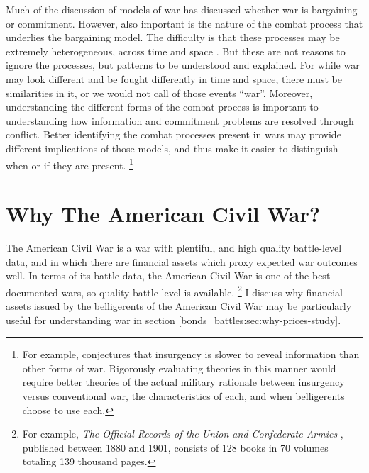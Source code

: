 Much of the discussion of models of war has discussed whether war is bargaining or commitment.
However, also important is the nature of the combat process that underlies the bargaining model. %
The difficulty is that these processes may be extremely heterogeneous, across time and space \parencite{Reiter2003}.
But these are not reasons to ignore the processes, but patterns to be understood and explained. %
For while war may look different and be fought differently in time and
space, there must be similarities in it, or we would not call of those events ``war''. %
Moreover, understanding the different forms of the combat process is important to understanding how information and commitment problems are resolved through conflict. %
Better identifying the combat processes present in wars may provide different implications of those models, and thus make it easier to
distinguish when or if they are present.%
\footnote{%
  For example, \textcite{Walter2009} conjectures that insurgency is slower to reveal information than other forms of war. %
  Rigorously evaluating theories in this manner would require better theories of the actual military rationale between insurgency versus conventional war, the characteristics of each, and when belligerents choose to use each.
} %



\section{Why The American Civil War?}
\label{bonds_battles:sec:why-american-civil}

The American Civil War is a war with plentiful, and high quality battle-level data, and in which there are financial assets which proxy expected war outcomes well.
In terms of its battle data, the American Civil War is one of the best documented wars, so quality battle-level is available.%
\footnote{%
  For example, \textit{The Official Records of the Union and  Confederate Armies} \parencites{US1901}, published between 1880 and 1901, consists of 128 books in 70 volumes totaling 139 thousand pages.
  
} %
I discuss why financial assets issued by the belligerents of the American Civil War may be particularly useful for understanding war in section \ref{bonds_battles:sec:why-prices-study}.

